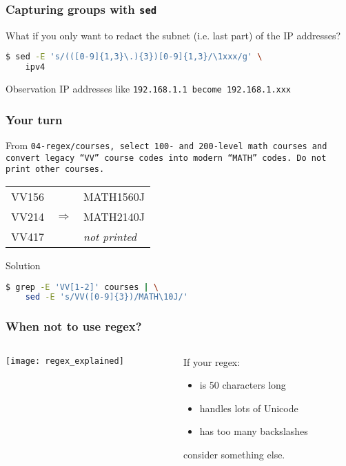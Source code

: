 \begin{frame}[fragile]
\frametitle{Capturing groups with \tt{sed}}
What if you only want to redact the subnet (i.e. last part) of the IP addresses?
\begin{lstlisting}[language=bash]
$ sed -E 's/(([0-9]{1,3}\.){3})[0-9]{1,3}/\1xxx/g' \
    ipv4
\end{lstlisting}
\begin{block}{Observation}
    IP addresses like \tt{192.168.1.1} become \tt{192.168.1.xxx}
\end{block}
\end{frame}

\begin{frame}[fragile]
\frametitle{Your turn}
From \tt{04-regex/courses}, select 100- and 200-level math courses and convert
legacy ``VV'' course codes into modern ``MATH'' codes.
Do not print other courses.
\begin{example}
    \begin{tabular}{lcl}
        VV156 & & MATH1560J \\
        VV214 & $\Longrightarrow$ & MATH2140J \\
        VV417 & & \textit{not printed}
    \end{tabular}
\end{example}
\pause
\begin{block}{Solution}
\begin{lstlisting}[language=bash]
$ grep -E 'VV[1-2]' courses | \
    sed -E 's/VV([0-9]{3})/MATH\10J/'
\end{lstlisting}
\end{block}
\end{frame}

\begin{frame}
\frametitle{When not to use regex?}
\begin{columns}
    \begin{column}{0.7\textwidth}
        \texttt{[image: regex\_explained]}
    \end{column}
    \begin{column}{0.3\textwidth}
        If your regex:
        \begin{itemize}
            \item is 50 characters long
            \item handles lots of Unicode
            \item has too many backslashes
        \end{itemize}
        consider something else.
    \end{column}
\end{columns}
\end{frame}

